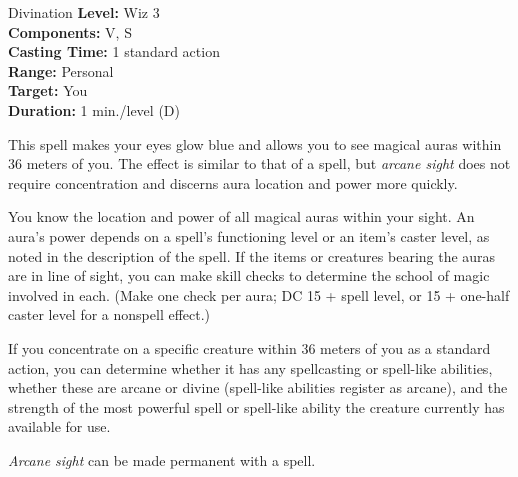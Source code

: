 {Divination}
{
	\textbf{Level:}
	Wiz 3\\
	\textbf{Components:}
	V, S\\
	\textbf{Casting Time:}
	1 standard action\\
	\textbf{Range:}
	Personal\\
	\textbf{Target:}
	You\\
	\textbf{Duration:}
	1 min./level (D)\\
}
{
	This spell makes your eyes glow blue and allows you to see magical auras within 36 meters of you. The effect is similar to that of a  spell, but \emph{arcane sight} does not require concentration and discerns aura location and power more quickly.

	You know the location and power of all magical auras within your sight. An aura's power depends on a spell's functioning level or an item's caster level, as noted in the description of the  spell. If the items or creatures bearing the auras are in line of sight, you can make  skill checks to determine the school of magic involved in each. (Make one check per aura; DC 15 + spell level, or 15 + one-half caster level for a nonspell effect.)

	If you concentrate on a specific creature within 36 meters of you as a standard action, you can determine whether it has any spellcasting or spell-like abilities, whether these are arcane or divine (spell-like abilities register as arcane), and the strength of the most powerful spell or spell-like ability the creature currently has available for use.

	\emph{Arcane sight} can be made permanent with a  spell.

}
